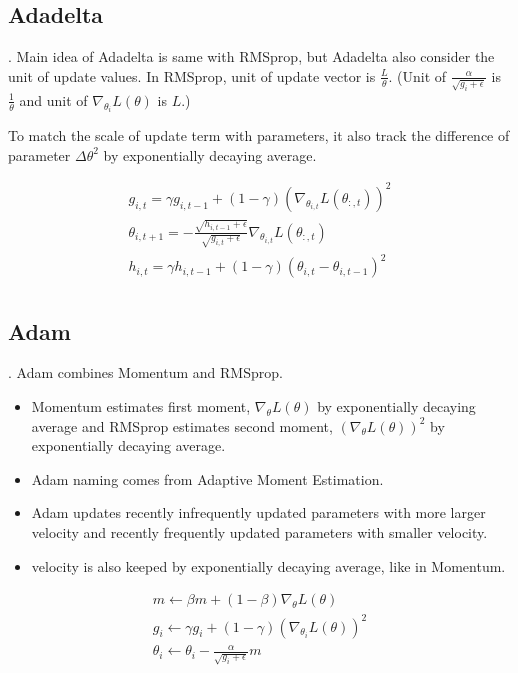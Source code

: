 \documentclass[8pt]{beamer}
\begin{document}
\subsection{Adadelta}
\begin{frame}{.}
    Main idea of Adadelta is same with RMSprop, but Adadelta also consider the unit of update values.
    In RMSprop, unit of update vector is $\frac{L}{\theta}$. (Unit of $\frac{\alpha}{\sqrt{g_i + \epsilon}}$ is  $\frac{1}{\theta}$ and unit of $\nabla_{\theta_i} L(\theta)$ is $L$.)

    To match the scale of update term with parameters, it also track the difference of parameter $\Delta \theta^2$ by exponentially decaying average.

    \[
    \begin{gathered}
        g_{i,t} = \gamma g_{i,t-1} + (1- \gamma) (\nabla_{\theta_{i,t}} L(\theta_{:, t}))^2 \\
        \theta_{i,t+1} = -\frac{\sqrt{h_{i,t-1} + \epsilon}}{\sqrt{g_{i, t} + \epsilon}} \nabla_{\theta_{i,t}} L(\theta_{:,t}) \\
        h_{i,t} = \gamma h_{i,t-1} + (1-\gamma) (\theta_{i,t} - \theta_{i,t-1})^2 \\
    \end{gathered}
    \]

\end{frame}

\subsection{Adam}
\begin{frame}{.}
    Adam combines Momentum and RMSprop.
    \begin{itemize}
        \item Momentum estimates first moment, $\nabla_\theta L(\theta)$ by exponentially decaying average and RMSprop estimates second moment, $(\nabla_\theta L(\theta))^2$ by exponentially decaying average.
        \item Adam naming comes from Adaptive Moment Estimation.
        \item Adam updates recently infrequently updated parameters with more larger velocity and recently frequently updated parameters with smaller velocity.
        \item velocity is also keeped by exponentially decaying average, like in Momentum.
    \end{itemize}

    \[
    \begin{gathered}
        m \leftarrow \beta m + (1- \beta) \nabla_{\theta} L(\theta) \\
        g_i \leftarrow \gamma g_i  + (1- \gamma) (\nabla_{\theta_i} L(\theta))^2\\
        \theta_i \leftarrow \theta_i - \frac{\alpha}{\sqrt{g_i + \epsilon}} m
    \end{gathered}
    \]
\end{frame}
\end{document}
